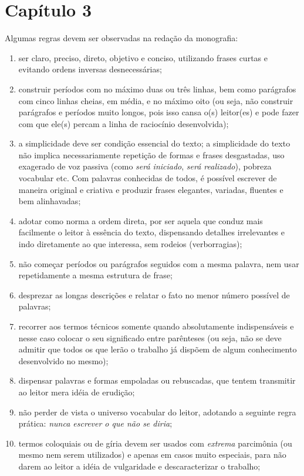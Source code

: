 \chapter{Capítulo 3}

Algumas regras devem ser observadas na redação da monografia:
\begin{enumerate}
	\item ser claro, preciso, direto, objetivo e conciso, utilizando frases curtas e evitando ordens inversas desnecessárias;
	\item construir períodos com no máximo duas ou três linhas, bem como parágrafos com cinco linhas cheias, em média, e no máximo oito (ou seja, não construir parágrafos e períodos muito longos, pois isso cansa o(s) leitor(es) e pode fazer com que ele(s) percam a linha de raciocínio desenvolvida);
	\item a simplicidade deve ser condição essencial do texto; a simplicidade do texto não implica necessariamente repetição de formas e frases desgastadas, uso exagerado de voz passiva (como \textit{será iniciado}, \textit{será realizado}), pobreza vocabular etc. Com palavras conhecidas de todos, é possível escrever de maneira original e criativa e produzir frases elegantes, variadas, fluentes e bem alinhavadas;
	\item adotar como norma a ordem direta, por ser aquela que conduz mais facilmente o leitor à essência do texto, dispensando detalhes irrelevantes e indo diretamente ao que interessa, sem rodeios (verborragias);
	\item não começar períodos ou parágrafos seguidos com a mesma palavra, nem usar repetidamente a mesma estrutura de frase;
	\item desprezar as longas descrições e relatar o fato no menor número possível de palavras;
	\item recorrer aos termos técnicos somente quando absolutamente indispensáveis e nesse caso colocar o seu significado entre parênteses (ou seja, não se deve admitir que todos os que lerão o trabalho já dispõem de algum conhecimento desenvolvido no mesmo);
	\item dispensar palavras e formas empoladas ou rebuscadas, que tentem transmitir ao leitor mera idéia de erudição;
	\item não perder de vista o universo vocabular do leitor, adotando a seguinte regra prática: \textit{nunca escrever o que não se diria};
	\item termos coloquiais ou de gíria devem ser usados com \textit{extrema} parcimônia (ou mesmo nem serem utilizados) e apenas em casos muito especiais, para não darem ao leitor a idéia de vulgaridade e descaracterizar o trabalho;

\end{enumerate}
